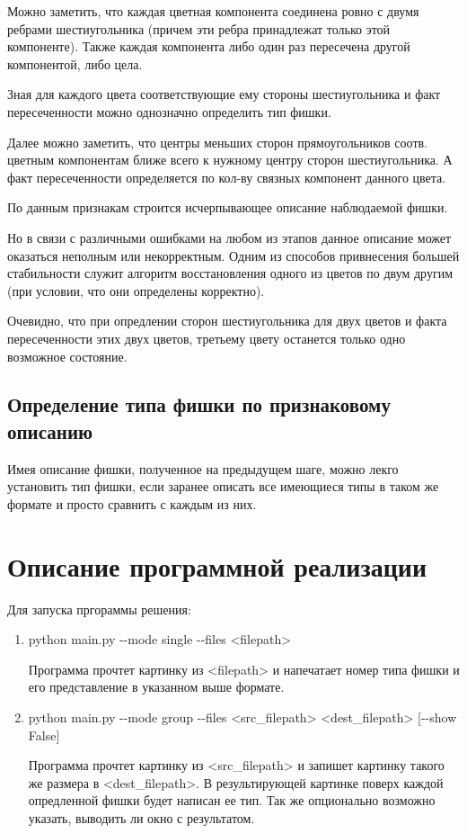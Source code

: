 \documentclass[10pt]{article}
\begin{document}
	Можно заметить, что каждая цветная компонента соединена ровно с двумя ребрами шестиугольника (причем эти ребра принадлежат только этой компоненте). Также каждая компонента либо один раз пересечена другой компонентой, либо цела.
	
	Зная для каждого цвета соответствующие ему стороны шестиугольника и факт пересеченности можно однозначно определить тип фишки.
	
	Далее можно заметить, что центры меньших сторон прямоугольников соотв. цветным компонентам ближе всего к нужному центру сторон шестиугольника. А факт пересеченности определяется по кол-ву связных компонент данного цвета.
	
	По данным признакам строится исчерпывающее описание наблюдаемой фишки.
	
	Но в связи с различными ошибками на любом из этапов данное описание может оказаться неполным или некорректным. Одним из способов привнесения большей стабильности служит алгоритм восстановления одного из цветов по двум другим (при условии, что они определены корректно).
	
	Очевидно, что при опредлении сторон шестиугольника для двух цветов и факта пересеченности этих двух цветов, третьему цвету останется только одно возможное состояние.
	
	
	\subsection*{Определение типа фишки по признаковому описанию}
	
	Имея описание фишки, полученное на предыдущем шаге, можно лекго установить тип фишки, если заранее описать все имеющиеся типы в таком же формате и просто сравнить с каждым из них.
	
	
	\section*{Описание программной реализации}
	
	Для запуска пргораммы решения:
	\begin{enumerate}
		\item python main.py {-}{-}mode single {-}{-}files <filepath>
		
		Программа прочтет картинку из <filepath> и напечатает номер типа фишки и его представление в указанном выше формате.
		
		\item python main.py {-}{-}mode group {-}{-}files <src\_filepath> <dest\_filepath> [{-}{-}show False]
		
		Программа прочтет картинку из <src\_filepath> и запишет картинку такого же размера в <dest\_filepath>. В результирующей картинке поверх каждой опредленной фишки будет написан ее тип.
		Так же опционально возможно указать, выводить ли окно с результатом. 
	\end{enumerate}
	
\end{document}
